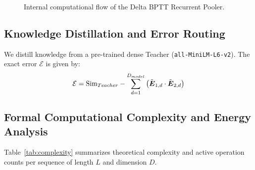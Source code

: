\documentclass[10pt,journal,compsoc]{IEEEtran}
\begin{document}
\begin{figure}[t!]
\begin{center}
{%
}
\end{center}
\caption{Internal computational flow of the Delta BPTT Recurrent Pooler.}
\label{fig:pooler_mech}
\end{figure}

\subsection{Knowledge Distillation and Error Routing}
We distill knowledge from a pre-trained dense Teacher (\texttt{all-MiniLM-L6-v2}). The exact error $\mathcal{E}$ is given by:
\begin{equation}
\mathcal{E} = \text{Sim}_{Teacher} - \sum_{d=1}^{D_{model}} \left(\tilde{\boldsymbol{E}}_{1,d} \cdot \tilde{\boldsymbol{E}}_{2,d}\right)
\end{equation}

\subsection{Formal Computational Complexity and Energy Analysis}
Table~\ref{tab:complexity} summarizes theoretical complexity and active operation counts per sequence of length $L$ and dimension $D$.
\end{document}
